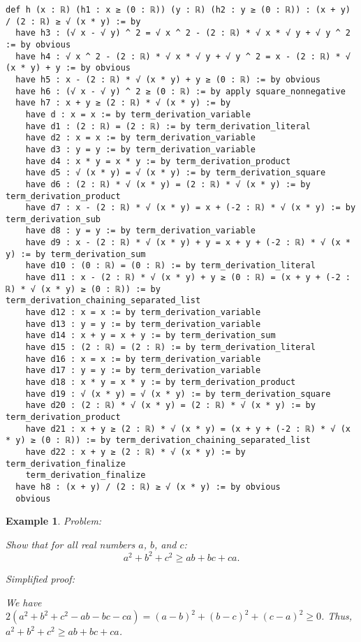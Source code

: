\documentclass{article}
\newtheorem{example}{Example}
\begin{document}
\begin{tcolorbox}[colback=white!10, width=\linewidth]
\begin{lstlisting}[language=Lean4]
def h (x : ℝ) (h1 : x ≥ (0 : ℝ)) (y : ℝ) (h2 : y ≥ (0 : ℝ)) : (x + y) / (2 : ℝ) ≥ √ (x * y) := by
  have h3 : (√ x - √ y) ^ 2 = √ x ^ 2 - (2 : ℝ) * √ x * √ y + √ y ^ 2 := by obvious
  have h4 : √ x ^ 2 - (2 : ℝ) * √ x * √ y + √ y ^ 2 = x - (2 : ℝ) * √ (x * y) + y := by obvious
  have h5 : x - (2 : ℝ) * √ (x * y) + y ≥ (0 : ℝ) := by obvious
  have h6 : (√ x - √ y) ^ 2 ≥ (0 : ℝ) := by apply square_nonnegative
  have h7 : x + y ≥ (2 : ℝ) * √ (x * y) := by
    have d : x = x := by term_derivation_variable
    have d1 : (2 : ℝ) = (2 : ℝ) := by term_derivation_literal
    have d2 : x = x := by term_derivation_variable
    have d3 : y = y := by term_derivation_variable
    have d4 : x * y = x * y := by term_derivation_product
    have d5 : √ (x * y) = √ (x * y) := by term_derivation_square
    have d6 : (2 : ℝ) * √ (x * y) = (2 : ℝ) * √ (x * y) := by term_derivation_product
    have d7 : x - (2 : ℝ) * √ (x * y) = x + (-2 : ℝ) * √ (x * y) := by term_derivation_sub
    have d8 : y = y := by term_derivation_variable
    have d9 : x - (2 : ℝ) * √ (x * y) + y = x + y + (-2 : ℝ) * √ (x * y) := by term_derivation_sum
    have d10 : (0 : ℝ) = (0 : ℝ) := by term_derivation_literal
    have d11 : x - (2 : ℝ) * √ (x * y) + y ≥ (0 : ℝ) = (x + y + (-2 : ℝ) * √ (x * y) ≥ (0 : ℝ)) := by term_derivation_chaining_separated_list
    have d12 : x = x := by term_derivation_variable
    have d13 : y = y := by term_derivation_variable
    have d14 : x + y = x + y := by term_derivation_sum
    have d15 : (2 : ℝ) = (2 : ℝ) := by term_derivation_literal
    have d16 : x = x := by term_derivation_variable
    have d17 : y = y := by term_derivation_variable
    have d18 : x * y = x * y := by term_derivation_product
    have d19 : √ (x * y) = √ (x * y) := by term_derivation_square
    have d20 : (2 : ℝ) * √ (x * y) = (2 : ℝ) * √ (x * y) := by term_derivation_product
    have d21 : x + y ≥ (2 : ℝ) * √ (x * y) = (x + y + (-2 : ℝ) * √ (x * y) ≥ (0 : ℝ)) := by term_derivation_chaining_separated_list
    have d22 : x + y ≥ (2 : ℝ) * √ (x * y) := by term_derivation_finalize
    term_derivation_finalize
  have h8 : (x + y) / (2 : ℝ) ≥ √ (x * y) := by obvious
  obvious

\end{lstlisting}
\end{tcolorbox}


\begin{example}
Problem:
\begin{tcolorbox}[colback=yellow!10, width=\linewidth]
Show that for all real numbers $a$, $b$, and $c$:
    $$a^2 + b^2 + c^2 \geq ab + bc + ca.$$
\end{tcolorbox}

Simplified proof:
\begin{tcolorbox}[colback=blue!10, width=\linewidth]
We have $2(a^2 + b^2 + c^2 - ab - bc - ca) = (a-b)^2 + (b-c)^2 + (c-a)^2 \ge 0$. Thus, $a^2 + b^2 + c^2 \geq ab + bc + ca$.
\end{tcolorbox}
\end{example}
\end{document}
